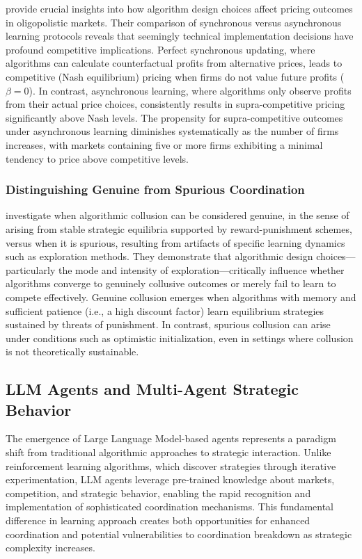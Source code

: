 \textcite{asker_artificial_2022, asker_impact_2024} provide crucial insights into how algorithm design choices affect pricing outcomes in oligopolistic markets. Their comparison of synchronous versus asynchronous learning protocols reveals that seemingly technical implementation decisions have profound competitive implications. Perfect synchronous updating, where algorithms can calculate counterfactual profits from alternative prices, leads to competitive (Nash equilibrium) pricing when firms do not value future profits ($\beta = 0$). In contrast, asynchronous learning, where algorithms only observe profits from their actual price choices, consistently results in supra-competitive pricing significantly above Nash levels. The propensity for supra-competitive outcomes under asynchronous learning diminishes systematically as the number of firms increases, with markets containing five or more firms exhibiting a minimal tendency to price above competitive levels.

\subsubsection*{Distinguishing Genuine from Spurious Coordination}

\textcite{calvano_algorithmic_2023} investigate when algorithmic collusion can be considered genuine, in the sense of arising from stable strategic equilibria supported by reward-punishment schemes, versus when it is spurious, resulting from artifacts of specific learning dynamics such as exploration methods. They demonstrate that algorithmic design choices—particularly the mode and intensity of exploration—critically influence whether algorithms converge to genuinely collusive outcomes or merely fail to learn to compete effectively. Genuine collusion emerges when algorithms with memory and sufficient patience (i.e., a high discount factor) learn equilibrium strategies sustained by threats of punishment. In contrast, spurious collusion can arise under conditions such as optimistic initialization, even in settings where collusion is not theoretically sustainable.

\subsection{LLM Agents and Multi-Agent Strategic Behavior}

The emergence of Large Language Model-based agents represents a paradigm shift from traditional algorithmic approaches to strategic interaction. Unlike reinforcement learning algorithms, which discover strategies through iterative experimentation, LLM agents leverage pre-trained knowledge about markets, competition, and strategic behavior, enabling the rapid recognition and implementation of sophisticated coordination mechanisms. This fundamental difference in learning approach creates both opportunities for enhanced coordination and potential vulnerabilities to coordination breakdown as strategic complexity increases.

